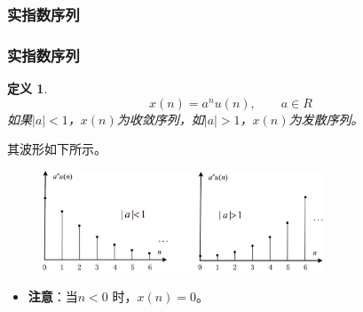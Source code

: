\documentclass[notheorems,compress,mathserif,table]{beamer}
\newtheorem{definition}{定义}
\begin{document}
\subsubsection*{实指数序列}
\begin{frame}\frametitle{实指数序列}%
\begin{definition}
\begin{equation*}
    x(n) = a^{n}u(n), \quad\quad a \in R
\end{equation*}
如果$|a|<1$，$x(n)$为收敛序列，如$|a|>1$，$x(n)$为发散序列。
\end{definition}
其波形如下所示。
\begin{figure}[h]
  \centering
  \includegraphics[width=0.75\textwidth]{shizhishu.jpg}\\
\end{figure}
\begin{itemize}
  \item\textbf{ 注意}：当$n<0$ 时，$x(n)=0$。
\end{itemize}
\end{frame}
\end{document}
